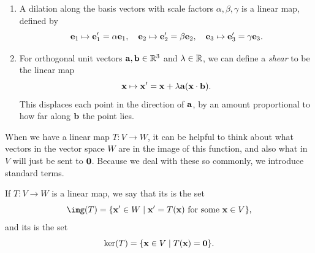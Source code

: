 \documentclass[a4paper]{scrartcl}
\begin{document}
\begin{example}
\begin{enumerate}[label=(\roman*)]
        \begin{center}
        \end{center}
    \item A dilation along the basis vectors with scale factors $\alpha, \beta, \gamma$ is a linear map, defined by
    $$
    \mathbf{e}_1 \mapsto \mathbf{e}_1' = \alpha \mathbf{e}_1, \quad \mathbf{e}_2 \mapsto \mathbf{e}_2' = \beta \mathbf{e}_2, \quad \mathbf{e}_3 \mapsto \mathbf{e}_3' = \gamma \mathbf{e}_3.
    $$
    \item For orthogonal unit vectors $\mathbf{a}, \mathbf{b} \in \mathbb{R}^3$ and $\lambda \in \mathbb{R}$, we can define a \emph{shear} to be the linear map
    $$
      \mathbf{x} \mapsto \mathbf{x}' = \mathbf{x} + \lambda \mathbf{a} (\mathbf{x} \cdot \mathbf{b}).
    $$
    This displaces each point in the direction of $\mathbf{a}$, by an amount proportional to how far along $\mathbf{b}$ the point lies.
\end{enumerate}
\end{example}

When we have a linear map $T: V \rightarrow W$, it can be helpful to think about what vectors in the vector space $W$ are in the image of this function, and also what in $V$ will just be sent to $\mathbf{0}$. Because we deal with these so commonly, we introduce standard terms.

\begin{definition}
    If $T: V \rightarrow W$ is a linear map, we say that its  is the set
    $$
    \img(T) = \{ \vv{x}' \in W \mid \vv{x}' = T(\vv{x}) \text{ for some } \vv{x} \in V\},
    $$ 
    and its  is the set
    $$
    \ker (T) = \{ \mathbf{x} \in V \mid T(\mathbf{x}) = \mathbf{0}\}.
    $$
\end{definition}
\end{document}
